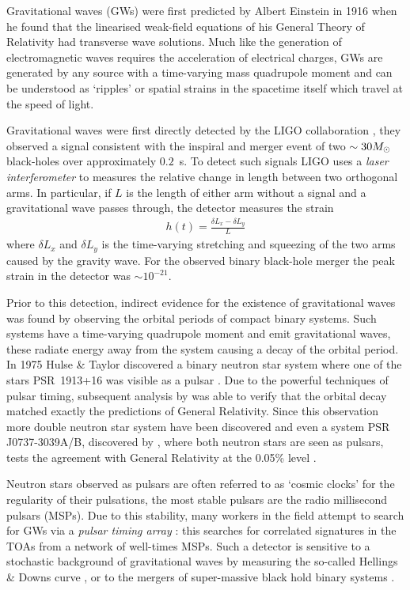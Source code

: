 Gravitational waves (GWs) were first predicted by Albert Einstein in 1916
\citep{einstein1916approximative} when he found that the linearised weak-field
equations of his General Theory of Relativity had transverse wave solutions.
Much like the generation of electromagnetic waves requires the acceleration of
electrical charges, GWs are generated by any source with a
time-varying mass quadrupole moment and can be understood as `ripples' or
spatial strains in the spacetime itself which travel at the speed of light.

Gravitational waves were first directly detected by the LIGO collaboration
\citep{abbott2016observation}, they observed a signal consistent with the
inspiral and merger event of two $\sim 30 M_{\odot}$ black-holes over approximately
$0.2$~s. To detect such signals LIGO uses a \emph{laser interferometer} to
measures the relative change in length between two orthogonal arms. In
particular, if $L$ is the length of either arm without a signal and a
gravitational wave passes through, the detector measures the strain
\begin{align}
h(t) = \frac{\delta L_x - \delta L_y}{L}
\end{align}
where $\delta L_x$ and $\delta L_y$ is the time-varying stretching and
squeezing of the two arms caused by the gravity wave. For the observed binary
black-hole merger the peak strain in the detector was $\sim 10^{-21}$.

Prior to this detection, indirect evidence for the existence of gravitational
waves was found by observing the orbital periods of compact binary systems.
Such systems have a time-varying quadrupole moment and emit gravitational
waves, these radiate energy away from the system causing a decay of the orbital
period. In 1975 Hulse \& Taylor discovered a binary neutron star system where
one of the stars PSR~1913+16 was visible as a pulsar \citep{Hulse1975}. Due to
the powerful techniques of pulsar timing, subsequent analysis by
\citet{Taylor1982} was able to verify that the orbital decay matched exactly
the predictions of General Relativity. Since this observation more double
neutron star system have been discovered and even a system PSR J0737-3039A/B,
discovered by \citet{burgay2003increased}, where both neutron stars are seen as
pulsars, tests the agreement with General Relativity at the 0.05\% level
\citep{kramerstairs2006}.

Neutron stars observed as pulsars are often referred to as `cosmic clocks' for
the regularity of their pulsations, the most stable pulsars are the radio
millisecond pulsars (MSPs). Due to this stability, many workers in the field
attempt to search for GWs via a \emph{pulsar timing array}
\citep{hobbs2010international}: this searches for correlated signatures in the
TOAs from a network of well-times MSPs. Such a detector is sensitive to a
stochastic background of gravitational waves by measuring the so-called
Hellings \& Downs curve \citep{hellings1983upper}, or to the mergers of
super-massive black hold binary systems \citep{lee2011gravitational}.

